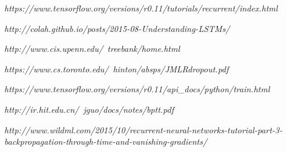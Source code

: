 \documentclass[10pt,a4paper,titlepage]{article}
\begin{document}
\newpage
{}
\begin{thebibliography}{9}
	
	\textit{https://www.tensorflow.org/versions/r0.11/tutorials/recurrent/index.html}
	
	\textit{http://colah.github.io/posts/2015-08-Understanding-LSTMs/}
	
	\textit{http://www.cis.upenn.edu/~treebank/home.html}
	
	\textit{https://www.cs.toronto.edu/~hinton/absps/JMLRdropout.pdf}
	
	\textit{https://www.tensorflow.org/versions/r0.11/api\_docs/python/train.html}
	
	\textit{http://ir.hit.edu.cn/~jguo/docs/notes/bptt.pdf}
	
	\textit{http://www.wildml.com/2015/10/recurrent-neural-networks-tutorial-part-3-backpropagation-through-time-and-vanishing-gradients/}
	
\end{thebibliography}
	
\end{document}
